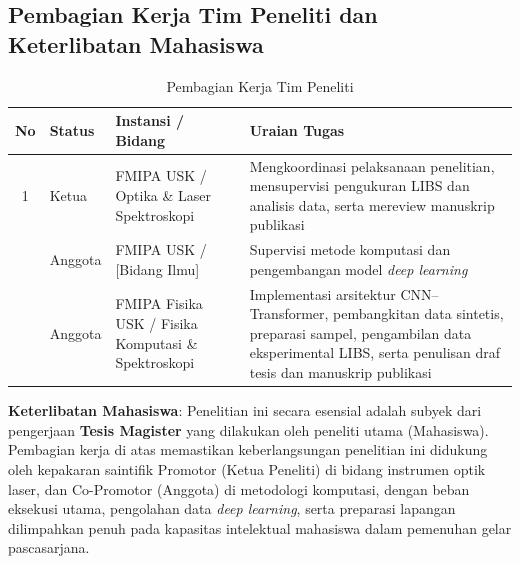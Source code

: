 \documentclass[12pt, a4paper]{article}
\begin{document}
\subsection{Pembagian Kerja Tim Peneliti dan Keterlibatan Mahasiswa}

\begin{table}[htbp]
\centering
\caption{Pembagian Kerja Tim Peneliti}
\label{tab:tim}
\small
\begin{tabular}{clp{3.5cm}p{6cm}}
\toprule
\textbf{No} & \textbf{Status} & \textbf{Instansi / Bidang} & \textbf{Uraian Tugas} \\
\midrule
1 & Ketua  & FMIPA USK / Optika \& Laser Spektroskopi & Mengkoordinasi pelaksanaan penelitian, mensupervisi pengukuran LIBS dan analisis data, serta mereview manuskrip publikasi \\
\addlinespace
2 & Anggota & FMIPA USK / [Bidang Ilmu] & Supervisi metode komputasi dan pengembangan model \textit{deep learning} \\
\addlinespace
3 & Anggota & FMIPA Fisika USK / Fisika Komputasi \& Spektroskopi & Implementasi arsitektur CNN--Transformer, pembangkitan data sintetis, preparasi sampel, pengambilan data eksperimental LIBS, serta penulisan draf tesis dan manuskrip publikasi \\
\bottomrule
\end{tabular}
\end{table}

\textbf{Keterlibatan Mahasiswa}: Penelitian ini secara esensial adalah subyek dari pengerjaan \textbf{Tesis Magister} yang dilakukan oleh peneliti utama (Mahasiswa). Pembagian kerja di atas memastikan keberlangsungan penelitian ini didukung oleh kepakaran saintifik Promotor (Ketua Peneliti) di bidang instrumen optik laser, dan Co-Promotor (Anggota) di metodologi komputasi, dengan beban eksekusi utama, pengolahan data \textit{deep learning}, serta preparasi lapangan dilimpahkan penuh pada kapasitas intelektual mahasiswa dalam pemenuhan gelar pascasarjana.


\end{document}
